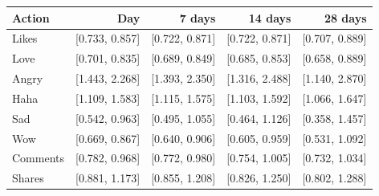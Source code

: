 \begin{tabular}{lrrrr}
\toprule
Action & Day & 7 days & 14 days & 28 days \\
\midrule
Likes & [0.733, 0.857] & [0.722, 0.871] & [0.722, 0.871] & [0.707, 0.889] \\
Love & [0.701, 0.835] & [0.689, 0.849] & [0.685, 0.853] & [0.658, 0.889] \\
Angry & [1.443, 2.268] & [1.393, 2.350] & [1.316, 2.488] & [1.140, 2.870] \\
Haha & [1.109, 1.583] & [1.115, 1.575] & [1.103, 1.592] & [1.066, 1.647] \\
Sad & [0.542, 0.963] & [0.495, 1.055] & [0.464, 1.126] & [0.358, 1.457] \\
Wow & [0.669, 0.867] & [0.640, 0.906] & [0.605, 0.959] & [0.531, 1.092] \\
Comments & [0.782, 0.968] & [0.772, 0.980] & [0.754, 1.005] & [0.732, 1.034] \\
Shares & [0.881, 1.173] & [0.855, 1.208] & [0.826, 1.250] & [0.802, 1.288] \\
\bottomrule
\end{tabular}

